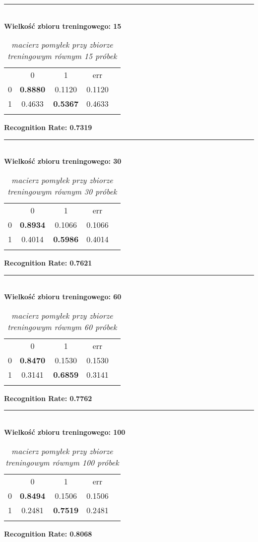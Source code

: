 \documentclass[a4paper,12pt]{article}
\newcommand{\linia}{\rule{\linewidth}{0.5pt}}
\theoremstyle{mytheor}
\begin{document}
\linia\\
\textbf{Wielkość zbioru treningowego: 15}
\begin{table}[H]
\begin{tabular}{ccccc}
 & 0 & 1 & err  &  \\
0 & \textbf{0.8880} & 0.1120 & 0.1120  \\
1 & 0.4633 & \textbf{0.5367} & 0.4633 \\
&&&
\end{tabular}
\caption{\textit{macierz pomyłek przy zbiorze treningowym równym 15 próbek}}
\label{tab:3}
\end{table}
\textbf{Recognition Rate: 0.7319}\\

\linia\\
\textbf{Wielkość zbioru treningowego: 30}
\begin{table}[H]
\begin{tabular}{ccccc}
 & 0 & 1 & err  &  \\
0 & \textbf{0.8934} & 0.1066 & 0.1066  \\
1 & 0.4014 & \textbf{0.5986} & 0.4014 \\
&&&
\end{tabular}
\caption{\textit{macierz pomyłek przy zbiorze treningowym równym 30 próbek}}
\label{tab:4}
\end{table}
\textbf{Recognition Rate: 0.7621}\\

\linia\\
\textbf{Wielkość zbioru treningowego: 60}
\begin{table}[H]
\begin{tabular}{ccccc}
 & 0 & 1 & err  &  \\
0 & \textbf{0.8470} & 0.1530 & 0.1530  \\
1 & 0.3141 & \textbf{0.6859} & 0.3141 \\
&&&
\end{tabular}
\caption{\textit{macierz pomyłek przy zbiorze treningowym równym 60 próbek}}
\label{tab:5}
\end{table}
\textbf{Recognition Rate: 0.7762}\\

\linia\\
\textbf{Wielkość zbioru treningowego: 100}
\begin{table}[H]
\begin{tabular}{ccccc}
 & 0 & 1 & err  &  \\
0 & \textbf{0.8494} & 0.1506 & 0.1506  \\
1 & 0.2481 & \textbf{0.7519} & 0.2481 \\
&&&
\end{tabular}
\caption{\textit{macierz pomyłek przy zbiorze treningowym równym 100 próbek}}
\label{tab:6}
\end{table}
\textbf{Recognition Rate: 0.8068}\\
\end{document}
